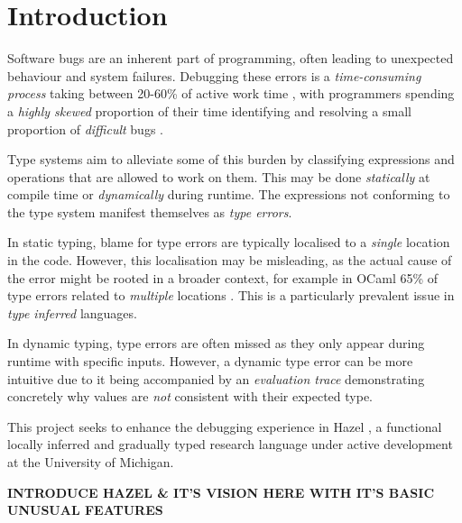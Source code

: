 \chapter{Introduction}
\label{chap:Introduction}
Software bugs are an inherent part of programming, often leading to unexpected behaviour and system failures. Debugging these errors is a \textit{time-consuming process} taking between 20-60\% of active work time \cite{DebugTimeSelfReport}, with programmers spending a \textit{highly skewed} proportion of their time identifying and resolving a small proportion of \textit{difficult} bugs \cite{DebugSkew}.

Type systems aim to alleviate some of this burden by classifying expressions and operations that are allowed to work on them. This may be done \textit{statically} at compile time or \textit{dynamically} during runtime. The expressions not conforming to the type system manifest themselves as \textit{type errors}.

In static typing, blame for type errors are typically localised to a \textit{single} location in the code. However, this localisation may be misleading, as the actual cause of the error might be rooted in a broader context, for example in OCaml 65\% of type errors related to \textit{multiple} locations \cite{StudentTypeErrorFixes}. This is a particularly prevalent issue in \textit{type inferred} languages.

In dynamic typing, type errors are often missed as they only appear during runtime with specific inputs. However, a dynamic type error can be more intuitive due to it being accompanied by an \textit{evaluation trace} demonstrating concretely why values are \textit{not} consistent with their expected type.

This project seeks to enhance the debugging experience in Hazel \cite{Hazel}, a functional locally inferred and gradually typed research language under active development at the University of Michigan. 

\textbf{INTRODUCE HAZEL \& IT'S VISION HERE WITH IT'S BASIC UNUSUAL FEATURES}

